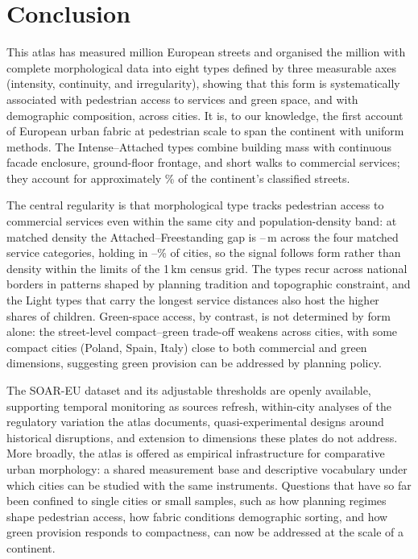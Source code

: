 \documentclass[review,authoryear]{elsarticle}
\begin{document}
\section{Conclusion}
\label{sec:conclusion}

This atlas has measured \nTotalM{} million European streets and organised the \nClassifiedM{} million with complete morphological data into eight types defined by three measurable axes (intensity, continuity, and irregularity), showing that this form is systematically associated with pedestrian access to services and green space, and with demographic composition, across \nCities{} cities. It is, to our knowledge, the first account of European urban fabric at pedestrian scale to span the continent with uniform methods. The Intense--Attached types combine building mass with continuous facade enclosure, ground-floor frontage, and short walks to commercial services; they account for approximately \pctIntenseAttached\% of the continent's classified streets.

The central regularity is that morphological type tracks pedestrian access to commercial services even within the same city and population-density band: at matched density the Attached--Freestanding gap is \matchedGainMin--\matchedGainMax\,m across the four matched service categories, holding in \matchedDirMin--\matchedDirMax\% of cities, so the signal follows form rather than density within the limits of the 1\,km census grid. The types recur across national borders in patterns shaped by planning tradition and topographic constraint, and the Light types that carry the longest service distances also host the higher shares of children. Green-space access, by contrast, is not determined by form alone: the street-level compact--green trade-off weakens across cities, with some compact cities (Poland, Spain, Italy) close to both commercial and green dimensions, suggesting green provision can be addressed by planning policy.

The SOAR-EU dataset and its adjustable thresholds are openly available, supporting temporal monitoring as sources refresh, within-city analyses of the regulatory variation the atlas documents, quasi-experimental designs around historical disruptions, and extension to dimensions these plates do not address. More broadly, the atlas is offered as empirical infrastructure for comparative urban morphology: a shared measurement base and descriptive vocabulary under which \nCities{} cities can be studied with the same instruments. Questions that have so far been confined to single cities or small samples, such as how planning regimes shape pedestrian access, how fabric conditions demographic sorting, and how green provision responds to compactness, can now be addressed at the scale of a continent.
\end{document}

